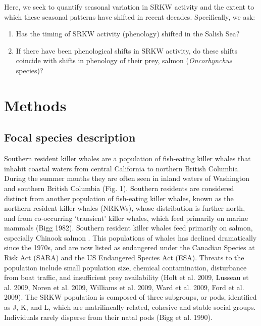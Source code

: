 \documentclass{article}
\begin{document}
\par Here, we seek to quantify seasonal variation in SRKW activity and the extent to which these seasonal patterns have shifted in recent decades.
Specifically, we ask:
\begin{enumerate}
\item Has the timing of SRKW activity (phenology) shifted in the Salish Sea? 
\item If there have been phenological shifts in SRKW activity, do these shifts coincide with shifts in phenology of their prey, salmon (\emph{Oncorhynchus} species)?
\end{enumerate}

\section* {Methods}
\subsection*{Focal species description}
Southern resident killer whales are a population of fish-eating killer whales that inhabit coastal waters from central California to northern British Columbia.  During the summer months they are often seen in inland waters of Washington and southern British Columbia (Fig. 1). Southern residents are considered distinct from another population of fish-eating killer whales, known as the northern resident killer whales (NRKWs), whose distribution is further north, and from co-occurring `transient' killer whales, which feed primarily on marine mammals (Bigg 1982). Southern resident killer whales feed primarily on salmon, especially Chinook salmon \citep{hanson2010}. This populations of whales has declined dramatically since the 1970s, and are now listed as endangered under the Canadian Species at Risk Act (SARA) and the US Endangered Species Act (ESA). Threats to the population include small population size, chemical contamination, disturbance from boat traffic, and insufficient prey availability (Holt et al. 2009, Lusseau et al. 2009, Noren et al. 2009, Williams et al. 2009, Ward et al. 2009, Ford et al. 2009). The SRKW population is composed of three subgroups, or pods, identified as J, K, and L, which are matrilineally related, cohesive and stable social groups. Individuals rarely disperse from their natal pods (Bigg et al. 1990).
\end{document}
